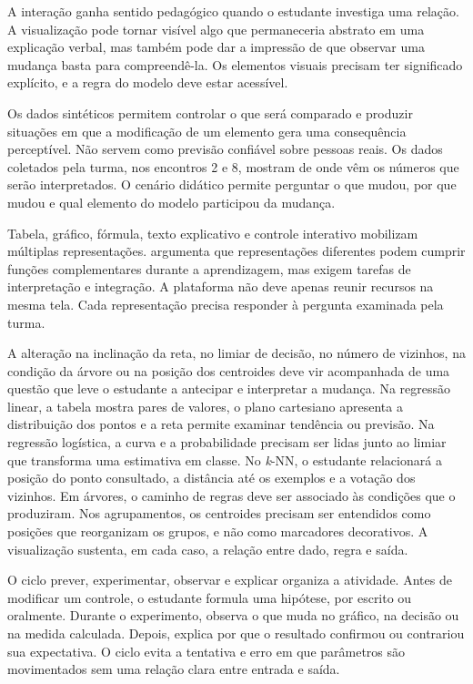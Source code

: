 A interação ganha sentido pedagógico quando o estudante investiga uma relação. A visualização pode tornar visível algo que permaneceria abstrato em uma explicação verbal, mas também pode dar a impressão de que observar uma mudança basta para compreendê-la. Os elementos visuais precisam ter significado explícito, e a regra do modelo deve estar acessível.

Os dados sintéticos permitem controlar o que será comparado e produzir situações em que a modificação de um elemento gera uma consequência perceptível. Não servem como previsão confiável sobre pessoas reais. Os dados coletados pela turma, nos encontros 2 e 8, mostram de onde vêm os números que serão interpretados. O cenário didático permite perguntar o que mudou, por que mudou e qual elemento do modelo participou da mudança.

Tabela, gráfico, fórmula, texto explicativo e controle interativo mobilizam múltiplas representações.  argumenta que representações diferentes podem cumprir funções complementares durante a aprendizagem, mas exigem tarefas de interpretação e integração. A plataforma não deve apenas reunir recursos na mesma tela. Cada representação precisa responder à pergunta examinada pela turma.

A alteração na inclinação da reta, no limiar de decisão, no número de vizinhos, na condição da árvore ou na posição dos centroides deve vir acompanhada de uma questão que leve o estudante a antecipar e interpretar a mudança. Na regressão linear, a tabela mostra pares de valores, o plano cartesiano apresenta a distribuição dos pontos e a reta permite examinar tendência ou previsão. Na regressão logística, a curva e a probabilidade precisam ser lidas junto ao limiar que transforma uma estimativa em classe. No \textit{k}-NN, o estudante relacionará a posição do ponto consultado, a distância até os exemplos e a votação dos vizinhos. Em árvores, o caminho de regras deve ser associado às condições que o produziram. Nos agrupamentos, os centroides precisam ser entendidos como posições que reorganizam os grupos, e não como marcadores decorativos. A visualização sustenta, em cada caso, a relação entre dado, regra e saída.

O ciclo prever, experimentar, observar e explicar organiza a atividade. Antes de modificar um controle, o estudante formula uma hipótese, por escrito ou oralmente. Durante o experimento, observa o que muda no gráfico, na decisão ou na medida calculada. Depois, explica por que o resultado confirmou ou contrariou sua expectativa. O ciclo evita a tentativa e erro em que parâmetros são movimentados sem uma relação clara entre entrada e saída.


